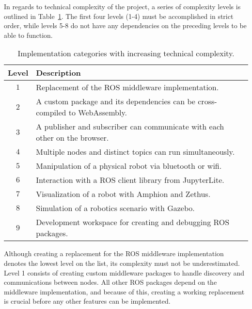         In regards to technical complexity of the project, a series of complexity levels is outlined in Table~\ref{tab:techlevels}. The first four levels (1-4) must be accomplished in strict order, while levels 5-8 do not have any dependencies on the preceding levels to be able to function.        

        \begin{table}[htbp]
            \color{textColor}
            \centering	
            \caption{Implementation categories with increasing technical complexity.}
                \begin{tabular}{cl}
                    \toprule
                    \textbf{Level} & \textbf{Description} \\
                    \midrule
                    $1$ & Replacement of the \ac{ROS} middleware implementation. \\ [0.3em]
                    $2$ & A custom package and its dependencies can be cross-compiled to WebAssembly. \\[0.3em]
                    $3$ & A publisher and subscriber can communicate with each other on the browser.\\[0.3em]
                    $4$ & Multiple nodes and distinct topics can run simultaneously. \\[0.3em]
                    $5$ & Manipulation of a physical robot via bluetooth or wifi. \\[0.3em]
                    $6$ & Interaction with a ROS client library from JupyterLite. \\[0.3em]
                    $7$ & Visualization of a robot with Amphion and Zethus. \\[0.3em]
                    $8$ & Simulation of a robotics scenario with Gazebo. \\[0.3em]
                    $9$ & Development workspace for creating and debugging ROS packages. \\
                \bottomrule
            \end{tabular}\label{tab:techlevels}
        \end{table}

        Although creating a replacement for the \ac{ROS} middleware implementation denotes the lowest level on the list, its complexity must not be underestimated. Level 1 consists of creating custom middleware packages to handle discovery and communications between nodes. All other \ac{ROS} packages depend on the middleware implementation, and because of this, creating a working replacement is crucial before any other features can be implemented.

